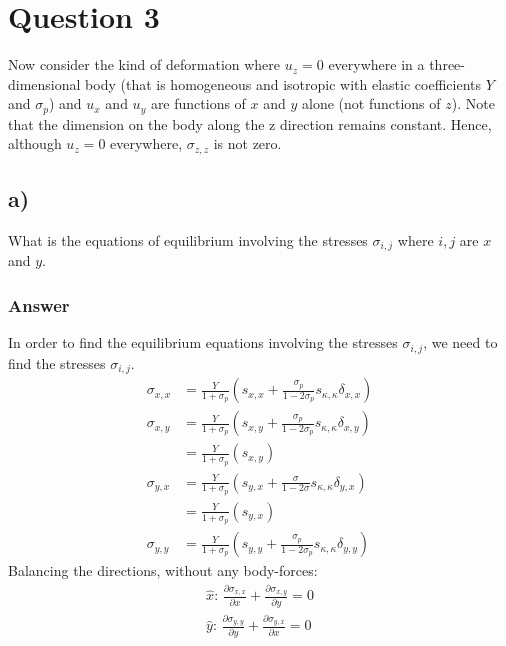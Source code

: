 \documentclass{article}
\begin{document}
\begin{comment}
    \implies \frac{Y}{2(1-2\sigma)}\left(\frac{\partial^2 u_\alpha}{\partial x_\beta^2} + \frac{\partial^2 u_\beta}{\partial x_\alpha\partial x_\beta}\right) &= \rho\frac{\partial^2 u_\alpha}{\partial t^2}\\
    \implies \frac{Y}{2(1-2\sigma)}\left(\frac{\partial^2 u_\alpha}{\partial x_\beta^2} + \frac{\partial^2 u_\beta}{\partial x_\alpha\partial x_\beta}\right) &= \rho\frac{\partial^2 u_\alpha}{\partial t^2}\\
\end{align*}This is the equation of deformation of a small volume in a homogeneous and isotropic material in three dimensions.
\end{comment}
\section*{Question 3}
Now consider the kind of deformation where $u_z = 0$ everywhere in a three-dimensional body (that is homogeneous and isotropic with elastic coefficients $Y$ and $\sigma_p$) and $u_x$ and $u_y$ are functions of $x$ and $y$ alone (not functions of $z$).
Note that the dimension on the body along the z direction remains constant. Hence, although $u_z = 0$ everywhere, $\sigma_{z,z}$ is not zero.
\subsection*{a)}
What is the equations of equilibrium involving the stresses $\sigma_{i,j}$ where $i,j$ are $x$ and $y$.

\subsubsection*{Answer}
In order to find the equilibrium equations involving the stresses $\sigma_{i,j}$, we need to find the stresses $\sigma_{i,j}$.
\begin{align*}
    \sigma_{x,x} &= \frac{Y}{1+\sigma_p}\left(s_{x,x} + \frac{\sigma_p}{1-2\sigma_p}s_{\kappa, \kappa}\delta_{x,x}\right)\\
    \sigma_{x,y} &= \frac{Y}{1+\sigma_p}\left(s_{x,y} + \frac{\sigma_p}{1-2\sigma_p}s_{\kappa, \kappa}\delta_{x,y}\right)\\
    &= \frac{Y}{1+\sigma_p}\left(s_{x,y}\right)\\
    \sigma_{y,x} &= \frac{Y}{1+\sigma_p}\left(s_{y,x} + \frac{\sigma}{1-2\sigma}s_{\kappa, \kappa}\delta_{y,x}\right)\\
    &= \frac{Y}{1+\sigma_p}\left(s_{y,x}\right)\\
    \sigma_{y,y} &= \frac{Y}{1+\sigma_p}\left(s_{y,y} + \frac{\sigma_p}{1-2\sigma_p}s_{\kappa, \kappa}\delta_{y,y}\right)
\end{align*}
Balancing the directions, without any body-forces:
\begin{align*}
    \text{$\hat{x}$: } \frac{\partial \sigma_{x,x}}{\partial x} + \frac{\partial \sigma_{x,y}}{\partial y} = 0\\
    \text{$\hat{y}$: } \frac{\partial \sigma_{y,y}}{\partial y} + \frac{\partial \sigma_{y,x}}{\partial x} = 0\\
\end{align*}
\end{document}
